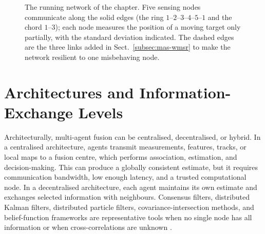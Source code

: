 \begin{figure}[!t]
\centering
{}
\caption{The running network of the chapter. Five sensing nodes communicate along the solid edges (the ring $1$--$2$--$3$--$4$--$5$--$1$ and the chord $1$--$3$); each node measures the position of a moving target only partially, with the standard deviation indicated. The dashed edges are the three links added in Sect.~\ref{subsec:mas-wmsr} to make the network resilient to one misbehaving node.}
\label{fig:mas-network}
\end{figure}

\section{Architectures and Information-Exchange Levels}
\label{sec:mas-architectures}

Architecturally, multi-agent fusion can be centralised, decentralised, or hybrid. In a centralised architecture, agents transmit measurements, features, tracks, or local maps to a fusion centre, which performs association, estimation, and decision-making. This can produce a globally consistent estimate, but it requires communication bandwidth, low enough latency, and a trusted computational node. In a decentralised architecture, each agent maintains its own estimate and exchanges selected information with neighbours. Consensus filters, distributed Kalman filters, distributed particle filters, covariance-intersection methods, and belief-function frameworks are representative tools when no single node has all information or when cross-correlations are unknown \cite{khaleghi_multisensor_2013,foglietta_networked_2012}.

